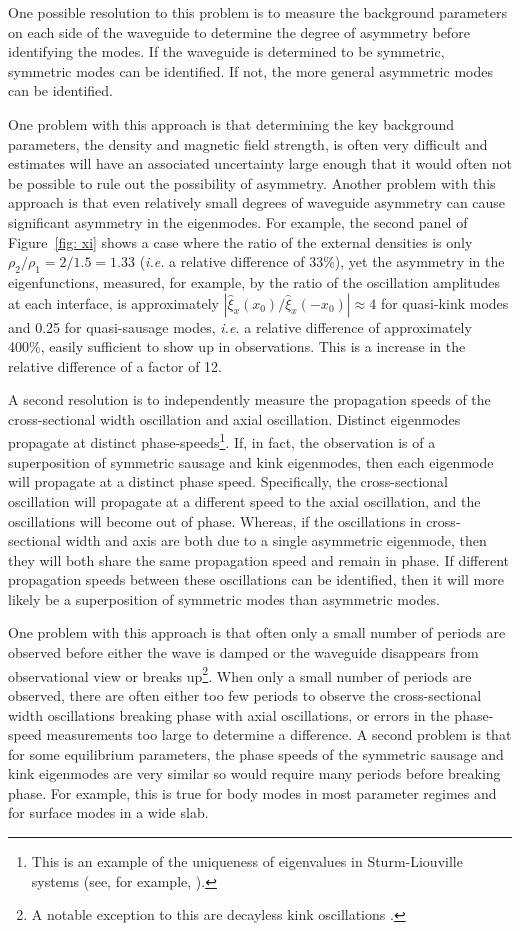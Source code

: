 One possible resolution to this problem is to measure the background parameters on each side of the waveguide to determine the degree of asymmetry before identifying the modes. If the waveguide is determined to be symmetric, symmetric modes can be identified. If not, the more general asymmetric modes can be identified.

One problem with this approach is that determining the key background parameters, the density and magnetic field strength, is often very difficult and estimates will have an associated uncertainty large enough that it would often not be possible to rule out the possibility of asymmetry. Another problem with this approach is that even relatively small degrees of waveguide asymmetry can cause significant asymmetry in the eigenmodes. For example, the second panel of Figure~\ref{fig: xi} shows a case where the ratio of the external densities is only $\rho_2 / \rho_1 = 2/1.5 = 1.33$ (\textit{i.e.} a relative difference of 33\%), yet the asymmetry in the eigenfunctions, measured, for example, by the ratio of the oscillation amplitudes at each interface, is approximately $|\widehat{\xi}_x(x_0) / \widehat{\xi}_x(-x_0)| \approx 4$ for quasi-kink modes and 0.25 for quasi-sausage modes, \textit{i.e.} a relative difference of approximately 400\%, easily sufficient to show up in observations. This is a increase in the relative difference of a factor of 12.

A second resolution is to independently measure the propagation speeds of the cross-sectional width oscillation and axial oscillation. Distinct eigenmodes propagate at distinct phase-speeds\footnote{This is an example of the uniqueness of eigenvalues in Sturm-Liouville systems (see, for example, \citealp{boy_etal12}).}. If, in fact, the observation is of a superposition of symmetric sausage and kink eigenmodes, then each eigenmode will propagate at a distinct phase speed. Specifically, the cross-sectional oscillation will propagate at a different speed to the axial oscillation, and the oscillations will become out of phase. Whereas, if the oscillations in cross-sectional width and axis are both due to a single asymmetric eigenmode, then they will both share the same propagation speed and remain in phase. If different propagation speeds between these oscillations can be identified, then it will more likely be a superposition of symmetric modes than asymmetric modes.

One problem with this approach is that often only a small number of periods are observed before either the wave is damped or the waveguide disappears from observational view or breaks up\footnote{A notable exception to this are decayless kink oscillations \citep{nis_etal13}.}. When only a small number of periods are observed, there are often either too few periods to observe the cross-sectional width oscillations breaking phase with axial oscillations, or errors in the phase-speed measurements too large to determine a difference. A second problem is that for some equilibrium parameters, the phase speeds of the symmetric sausage and kink eigenmodes are very similar so would require many periods before breaking phase. For example, this is true for body modes in most parameter regimes and for surface modes in a wide slab.


